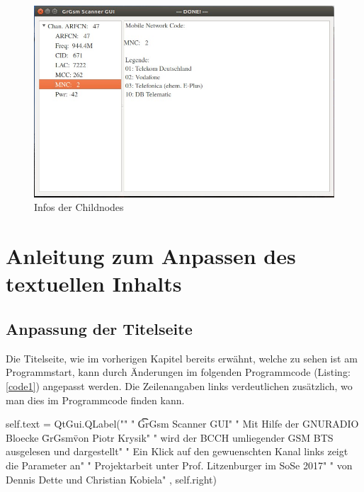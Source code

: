 \begin{figure}[H]
\centering
\includegraphics[scale=0.5]{GUI_childinfo}
\caption{Infos der Childnodes}
\label{fig6}
\end{figure}


\section{Anleitung zum Anpassen des textuellen Inhalts}

\subsection*{Anpassung der Titelseite}
Die Titelseite, wie im vorherigen Kapitel bereits erwähnt, welche zu sehen ist am Programmstart, kann durch Änderungen im folgenden Programmcode (Listing: \ref{code1}) angepasst werden.
Die Zeilenangaben links verdeutlichen zusätzlich, wo man dies im Programmcode finden kann.

\begin{code}[firstnumber=100,numbers=left,stepnumber=1, caption={Titelseite},captionpos=b,label={code1}]
self.text = QtGui.QLabel("\n"
                         " \t\t   GrGsm Scanner GUI\n\n\n"
                         " Mit Hilfe der GNURADIO Bloecke \"GrGsm\" von Piotr Krysik\n"
                         " wird der BCCH umliegender GSM BTS ausgelesen und dargestellt\n\n"
                         " Ein Klick auf den gewuenschten Kanal links zeigt die Parameter an\n\n\n\n\n\n\n\n\n\n\n"
                         " Projektarbeit unter Prof. Litzenburger im SoSe 2017\n"
                         " von Dennis Dette und Christian Kobiela\n\n"
                         , self.right)
\end{code} 

